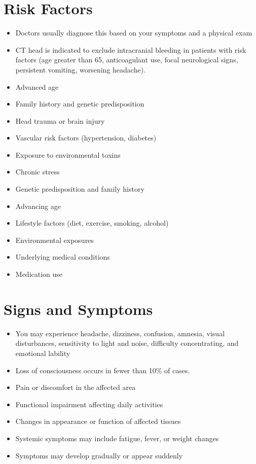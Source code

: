 \section{Risk Factors}
\begin{itemize}[noitemsep]
  \item Doctors usually diagnose this based on your symptoms and a physical exam
  \item CT head is indicated to exclude intracranial bleeding in patients with risk factors (age greater than 65, anticoagulant use, focal neurological signs, persistent vomiting, worsening headache).
  \item Advanced age
  \item Family history and genetic predisposition
  \item Head trauma or brain injury
  \item Vascular risk factors (hypertension, diabetes)
  \item Exposure to environmental toxins
  \item Chronic stress
  \item Genetic predisposition and family history
  \item Advancing age
  \item Lifestyle factors (diet, exercise, smoking, alcohol)
  \item Environmental exposures
  \item Underlying medical conditions
  \item Medication use
\end{itemize}
\section{Signs and Symptoms}
\begin{itemize}[noitemsep]
  \item You may experience headache, dizziness, confusion, amnesia, visual disturbances, sensitivity to light and noise, difficulty concentrating, and emotional lability
  \item Loss of consciousness occurs in fewer than 10\% of cases.
  \item Pain or discomfort in the affected area
  \item Functional impairment affecting daily activities
  \item Changes in appearance or function of affected tissues
  \item Systemic symptoms may include fatigue, fever, or weight changes
  \item Symptoms may develop gradually or appear suddenly
\end{itemize}
